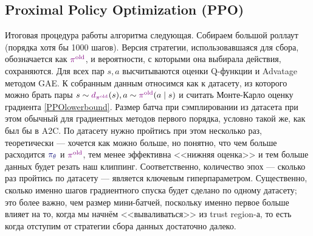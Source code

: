 \subsection{Proximal Policy Optimization (PPO)}

Итоговая процедура работы алгоритма следующая. Собираем большой роллаут (порядка хотя бы 1000 шагов). Версия стратегии, использовавшаяся для сбора, обозначается как $\textcolor{ChadPurple}{\pi^{\old}}$, и вероятности, с которыми она выбирала действия, сохраняются. Для всех пар $s, a$ высчитываются оценки Q-функции и Advatage методом GAE. К собранным данным относимся как к датасету, из которого можно брать пары $s \sim \textcolor{ChadPurple}{d_{\pi^{\old}}}(s), a \sim \textcolor{ChadPurple}{\pi^{\old}}(a \mid s)$ и считать Монте-Карло оценку градиента \eqref{PPOlowerbound}. Размер батча при сэмплировании из датасета при этом обычный для градиентных методов первого порядка, условно такой же, как был бы в A2C. По датасету нужно пройтись при этом несколько раз, теоретически --- хочется как можно больше, но понятно, что чем больше расходится $\textcolor{ChadBlue}{\pi_\theta}$ и $\textcolor{ChadPurple}{\pi^{\old}}$, тем менее эффективна <<нижняя оценка>> и тем больше данных будет резать наш клиппинг. Соответственно, количество эпох --- сколько раз пройтись по датасету --- является ключевым гиперпараметром. Существенно, сколько именно шагов градиентного спуска будет сделано по одному датасету; это более важно, чем размер мини-батчей, поскольку именно первое больше влияет на то, когда мы начнём <<вываливаться>> из trust region-а, то есть когда отступим от стратегии сбора данных достаточно далеко. 

